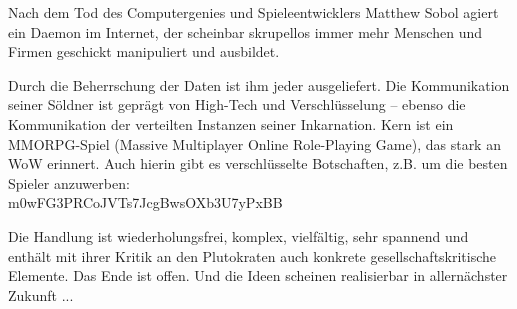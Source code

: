\begin{refsegment}
\begin{description}
    Nach dem Tod des Computergenies und Spieleentwicklers Matthew Sobol agiert ein Daemon
    im Internet, der scheinbar skrupellos immer mehr Menschen und Firmen geschickt
    manipuliert und ausbildet.

    Durch die Beherrschung der Daten ist ihm jeder ausgeliefert. Die Kommunikation seiner
    Söldner ist geprägt von High-Tech und Verschlüsselung -- ebenso die Kommunikation der
    verteilten Instanzen seiner Inkarnation. Kern ist ein MMORPG-Spiel (Massive
    Multiplayer Online Role-Playing Game), das stark an WoW erinnert. Auch hierin gibt es
    verschlüsselte Botschaften, z.B. um die besten Spieler anzuwerben:\\
	m0wFG3PRCoJVTs7JcgBwsOXb3U7yPxBB

    Die Handlung ist wiederholungsfrei, komplex, vielfältig, sehr spannend und enthält mit
    ihrer Kritik an den Plutokraten auch konkrete gesellschaftskritische Elemente.
    Das Ende ist offen. Und die Ideen scheinen realisierbar in allernächster Zukunft ...\\





\end{description}
\end{refsegment}
